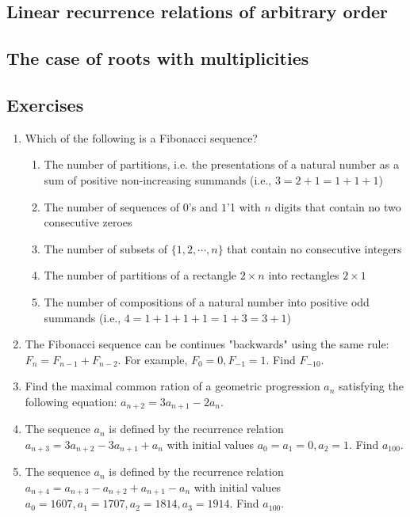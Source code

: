 \subsection{Linear recurrence relations of arbitrary order}

\subsection{The case of roots with multiplicities}

\subsection{Exercises}

\begin{enumerate}
\item Which of the following is a Fibonacci sequence?
\begin{enumerate}
\item The number of partitions, i.e. the presentations of a natural number as a sum of positive non-increasing summands (i.e., $3=2+1=1+1+1$)
\item The number of sequences of $0$'s and $1$'1 with $n$ digits that contain no two consecutive zeroes
\item The number of subsets of $\{1,2, \cdots, n\}$ that contain no consecutive integers
\item The number of partitions of a rectangle $2 \times n$ into rectangles $2 \times 1$
\item The number of compositions of a natural number into positive odd summands (i.e., $4=1+1+1+1=1+3=3+1$)
\end{enumerate}
\item The Fibonacci sequence can be continues "backwards" using the same rule: $F_n=F_{n-1}+F_{n-2}$. For example, $F_0=0, F_{-1}=1$. Find $F_{-10}$.
\item Find the maximal common ration of a geometric progression $a_n$ satisfying the following equation: $a_{n+2}=3a_{n+1}-2a_n$.
\item The sequence $a_n$ is defined by the recurrence relation $a_{n+3}=3a_{n+2}-3a_{n+1}+a_n$ with initial values $a_0=a_1=0, a_2=1$. Find $a_{100}$.
\item The sequence $a_n$ is defined by the recurrence relation $a_{n+4}=a_{n+3}-a_{n+2}+a_{n+1}-a_n$ with initial values $a_0=1607, a_1=1707, a_2=1814, a_3=1914$. Find $a_{100}$.
\end{enumerate}